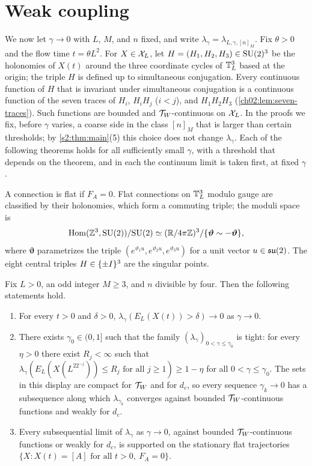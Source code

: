 \section{Weak coupling}\label{s2:weak}

We now let $\gamma\to0$ with $L$, $M$, and $n$ fixed, and write $\lambda_\gamma=\lambda_{L,\gamma,[n]_M}$. Fix $\theta>0$ and the flow time $t=\theta L^2$. For $X\in\mathcal X_L$, let $H=(H_1,H_2,H_3)\in\mathrm{SU}(2)^3$ be the holonomies of $X(t)$ around the three coordinate cycles of $\mathbb T_L^3$ based at the origin; the triple $H$ is defined up to simultaneous conjugation. Every continuous function of $H$ that is invariant under simultaneous conjugation is a continuous function of the seven traces of $H_i$, $H_iH_j$ ($i<j$), and $H_1H_2H_3$ (\cref{ch02:lem:seven-traces}). Such functions are bounded and $\mathcal T_W$-continuous on $\mathcal X_L$. In the proofs we fix, before $\gamma$ varies, a coarse side in the class $[n]_M$ that is larger than certain thresholds; by \cref{s2:thm:main}(5) this choice does not change $\lambda_\gamma$. Each of the following theorems holds for all sufficiently small $\gamma$, with a threshold that depends on the theorem, and in each the continuum limit is taken first, at fixed $\gamma$.

A connection is flat if $F_A=0$. Flat connections on $\mathbb T_L^3$ modulo gauge are classified by their holonomies, which form a commuting triple; the moduli space is
\[
 \operatorname{Hom}(\mathbb Z^3,\mathrm{SU}(2))/\mathrm{SU}(2)\simeq(\mathbb R/4\pi\mathbb Z)^3/\{\bm\vartheta\sim-\bm\vartheta\},
\]
where $\bm\vartheta$ parametrizes the triple $(e^{\vartheta_1u},e^{\vartheta_2u},e^{\vartheta_3u})$ for a unit vector $u\in\mathfrak{su}(2)$. The eight central triples $H\in\{\pm I\}^3$ are the singular points.

\begin{theorem}\label{s2:thm:flat}
Fix $L>0$, an odd integer $M\ge3$, and $n$ divisible by four. Then the following statements hold.
\begin{enumerate}
\item For every $t>0$ and $\delta>0$, $\lambda_\gamma(E_L(X(t))>\delta)\to0$ as $\gamma\to0$.
\item There exists $\gamma_0\in(0,1]$ such that the family $(\lambda_\gamma)_{0<\gamma\le\gamma_0}$ is tight: for every $\eta>0$ there exist $R_j<\infty$ such that $\lambda_\gamma(E_L(X(L^22^{-j}))\le R_j\text{ for all }j\ge1)\ge1-\eta$ for all $0<\gamma\le\gamma_0$. The sets in this display are compact for $\mathcal T_W$ and for $d_c$, so every sequence $\gamma_k\to0$ has a subsequence along which $\lambda_{\gamma_k}$ converges against bounded $\mathcal T_W$-continuous functions and weakly for $d_c$.
\item Every subsequential limit of $\lambda_\gamma$ as $\gamma\to0$, against bounded $\mathcal T_W$-continuous functions or weakly for $d_c$, is supported on the stationary flat trajectories $\{X:X(t)=[A]\text{ for all }t>0,\ F_A=0\}$.
\end{enumerate}
\end{theorem}

